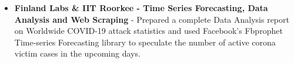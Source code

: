 \documentclass{article}
\begin{document}
\begin{itemize}
    \item{\textbf{\large{Finland Labs \& IIT Roorkee - Time Series Forecasting, Data Analysis and Web Scraping}}}
          \newline
          \textmd{- Prepared a complete Data Analysis report on Worldwide COVID-19 attack statistics and used Facebook's Fbprophet Time-series Forecasting library to speculate the number of active corona victim cases in the upcoming days.}





\end{itemize}
\end{document}
